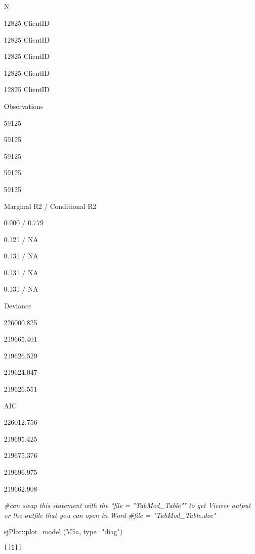 \documentclass[
  11pt,
]{book}
\newenvironment{Shaded}{\begin{snugshade}}{\end{snugshade}}
\newcommand{\AttributeTok}[1]{\textcolor[rgb]{0.77,0.63,0.00}{#1}}
\newcommand{\CommentTok}[1]{\textcolor[rgb]{0.56,0.35,0.01}{\textit{#1}}}
\newcommand{\FunctionTok}[1]{\textcolor[rgb]{0.00,0.00,0.00}{#1}}
\newcommand{\NormalTok}[1]{#1}
\newcommand{\SpecialCharTok}[1]{\textcolor[rgb]{0.00,0.00,0.00}{#1}}
\newcommand{\StringTok}[1]{\textcolor[rgb]{0.31,0.60,0.02}{#1}}
\begin{document}
~

~

~

~

N

12825 ClientID

12825 ClientID

12825 ClientID

12825 ClientID

12825 ClientID

Observations

59125

59125

59125

59125

59125

Marginal R2 / Conditional R2

0.000 / 0.779

0.121 / NA

0.131 / NA

0.131 / NA

0.131 / NA

Deviance

226000.825

219665.401

219626.529

219624.047

219626.551

AIC

226012.756

219695.425

219675.376

219696.975

219662.908

\begin{Shaded}
\begin{Highlighting}[]
\CommentTok{\#can swap this statement with the "file = "TabMod\_Table"" to get Viewer output or the outfile that you can open in Word}
\CommentTok{\#file = "TabMod\_Table.doc"}
\end{Highlighting}
\end{Shaded}

\begin{Shaded}
\begin{Highlighting}[]
\NormalTok{sjPlot}\SpecialCharTok{::}\FunctionTok{plot\_model}\NormalTok{ (M5a, }\AttributeTok{type=}\StringTok{"diag"}\NormalTok{)}
\end{Highlighting}
\end{Shaded}

\begin{verbatim}
[[1]]
\end{verbatim}
\end{document}
